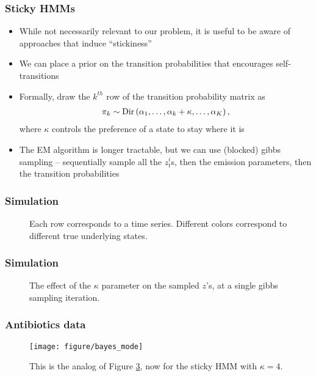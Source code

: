 \documentclass{beamer}
\begin{document}
\begin{frame}
  \frametitle{Sticky HMMs}
\begin{itemize}
\item While not necessarily relevant to our problem, it is useful to be aware
of approaches that induce ``stickiness''
\item We can place a prior on the transition probabilities that encourages
  self-transitions
  \item Formally, draw the $k^{th}$ row of the transition probability matrix as
\begin{align*}
  \pi_{k} \sim \textnormal{Dir}\left(\alpha_{1}, \dots, \alpha_{k} + \kappa, \dots, \alpha_{K}\right),
\end{align*}
where $\kappa$ controls the preference of a state to stay where it is
\item The EM algorithm is longer tractable, but we can use (blocked) gibbs
  sampling -- sequentially sample all the $z_{t}^{i}$s, then the emission
  parameters, then the transition probabilities
\end{itemize}
\end{frame}

\begin{frame}
  \frametitle{Simulation}
  \begin{figure}
    \centering
    \qquad
    \caption{Each row corresponds to a time series. Different colors correspond
      to different true underlying states.}
    \label{fig:sticky_hmm_kappas}
  \end{figure}

\end{frame}

\begin{frame}
  \frametitle{Simulation}
  \begin{figure}
    \centering
    \qquad
    \caption{The effect of the $\kappa$ parameter on the sampled $z$'s, at a
      single gibbs sampling iteration.}
    \label{fig:sticky_hmm_kappas}
  \end{figure}
\end{frame}

\begin{frame}
  \frametitle{Antibiotics data}
  \begin{figure}[ht]
    \centering
    \texttt{[image: figure/bayes\_mode]}
    \caption{This is the analog of Figure \ref{fig:hmm_mode}, now for the sticky
      HMM with $\kappa = 4$. \label{fig:hmm_mode} }
  \end{figure}
\end{frame}
\end{document}
